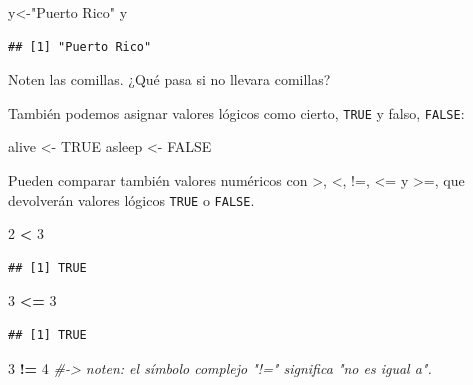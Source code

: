 \documentclass[
]{article}
\newenvironment{Shaded}{\begin{snugshade}}{\end{snugshade}}
\newcommand{\CommentTok}[1]{\textcolor[rgb]{0.56,0.35,0.01}{\textit{#1}}}
\newcommand{\ConstantTok}[1]{\textcolor[rgb]{0.56,0.35,0.01}{#1}}
\newcommand{\DecValTok}[1]{\textcolor[rgb]{0.00,0.00,0.81}{#1}}
\newcommand{\NormalTok}[1]{#1}
\newcommand{\OtherTok}[1]{\textcolor[rgb]{0.56,0.35,0.01}{#1}}
\newcommand{\SpecialCharTok}[1]{\textcolor[rgb]{0.81,0.36,0.00}{\textbf{#1}}}
\newcommand{\StringTok}[1]{\textcolor[rgb]{0.31,0.60,0.02}{#1}}
\begin{document}
\begin{Shaded}
\begin{Highlighting}[]
\NormalTok{y}\OtherTok{\textless{}{-}}\StringTok{"Puerto Rico"}
\NormalTok{y}
\end{Highlighting}
\end{Shaded}

\begin{verbatim}
## [1] "Puerto Rico"
\end{verbatim}

Noten las comillas. ¿Qué pasa si no llevara comillas?

También podemos asignar valores lógicos como cierto, \texttt{TRUE} y
falso, \texttt{FALSE}:

\begin{Shaded}
\begin{Highlighting}[]
\NormalTok{alive }\OtherTok{\textless{}{-}} \ConstantTok{TRUE}
\NormalTok{asleep }\OtherTok{\textless{}{-}} \ConstantTok{FALSE}
\end{Highlighting}
\end{Shaded}

Pueden comparar también valores numéricos con \textgreater, \textless,
!=, \textless= y \textgreater=, que devolverán valores lógicos
\texttt{TRUE} o \texttt{FALSE}.

\begin{Shaded}
\begin{Highlighting}[]
\DecValTok{2} \SpecialCharTok{\textless{}} \DecValTok{3}
\end{Highlighting}
\end{Shaded}

\begin{verbatim}
## [1] TRUE
\end{verbatim}

\begin{Shaded}
\begin{Highlighting}[]
\DecValTok{3} \SpecialCharTok{\textless{}=} \DecValTok{3}
\end{Highlighting}
\end{Shaded}

\begin{verbatim}
## [1] TRUE
\end{verbatim}

\begin{Shaded}
\begin{Highlighting}[]
\DecValTok{3} \SpecialCharTok{!=} \DecValTok{4} \CommentTok{\#{-}\textgreater{} noten: el símbolo complejo "!=" significa "no es igual a".}
\end{Highlighting}
\end{Shaded}
\end{document}

